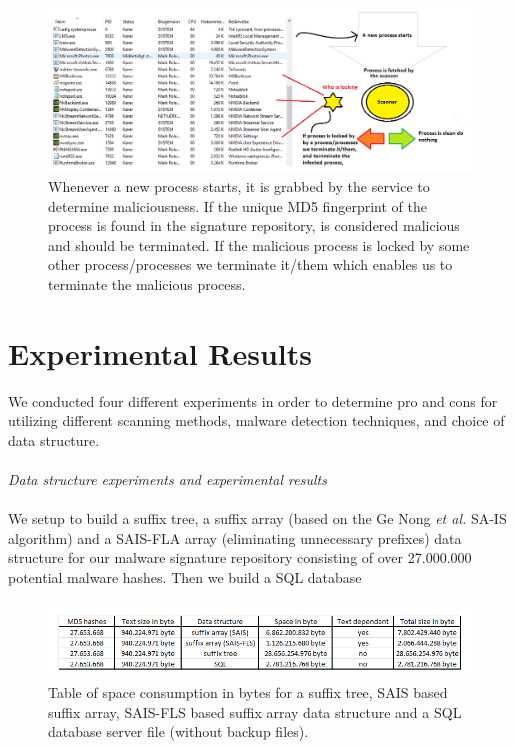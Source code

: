 \documentclass[12pt]{article} %
\begin{document}
\begin{figure}[H]
    \centering
    \includegraphics[width=1.0\textwidth]{windowsservice}
    \captionsetup{width=0.8\textwidth}
    \caption{Whenever a new process starts, it is grabbed by the service to determine maliciousness. If the unique MD5 fingerprint of the process is found in the signature repository, is considered malicious and should be terminated. If the malicious process is locked by some other process/processes we terminate it/them which enables us to terminate the malicious process.}
    \label{fig:totalmalware}
\end{figure}

\section{Experimental Results}
We conducted four different experiments in order to determine pro and cons for utilizing different scanning methods, malware detection techniques, and choice of data structure. 
\\ \\
\emph{Data structure experiments and experimental results}
\\ \\
We setup to build a suffix tree, a suffix array (based on the Ge Nong \emph{et al.}\cite{twoeffecient} SA-IS algorithm) and a  SAIS-FLA array (eliminating unnecessary prefixes) data structure for our malware signature repository consisting of over 27.000.000 potential malware hashes. Then we build a SQL database 

\begin{figure}[H]
    \centering
    \includegraphics[width=1.0\textwidth]{resultsuffixtree}
    \captionsetup{width=0.8\textwidth}
    \caption{Table of space consumption in bytes for a suffix tree, SAIS based suffix array, SAIS-FLS based suffix array data structure and a SQL database server file (without backup files).}
    \label{fig:resultsuffixtree}
\end{figure}
\end{document}

